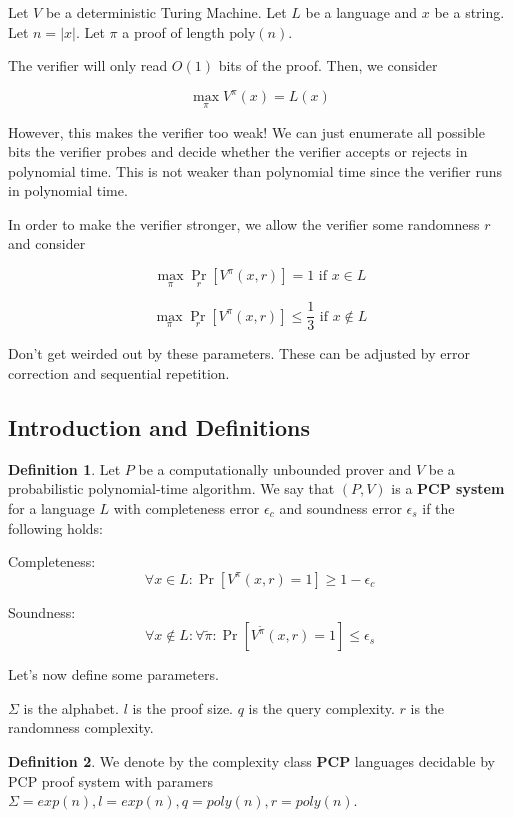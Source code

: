 \documentclass{article}
\theoremstyle{definition}
\newtheorem{definition}{Definition}
\begin{document}
Let $V$ be a deterministic Turing Machine.
Let $L$ be a language and $x$ be a string. Let $n = \lvert x \rvert$.
Let $\pi$ a proof of length $\text{poly}(n)$.

The verifier will only read $O(1)$ bits of the proof. Then, we consider

\[ \max_{\pi} V^{\pi}(x) = L(x) \]

However, this makes the verifier too weak! We can just enumerate all possible bits the verifier probes
and decide whether the verifier accepts or rejects in polynomial time. This is not weaker than polynomial time
since the verifier runs in polynomial time.

In order to make the verifier stronger, we allow the verifier some randomness $r$ and consider 

\[ \max_{\pi} \Pr_{r}[V^{\pi}(x,r)] = 1 \text{ if $x \in L$} \]

\[ \max_{\pi} \Pr_{r}[V^{\pi}(x,r)] \leq \frac{1}{3} \text{ if $x \notin L$} \]

Don't get weirded out by these parameters. These can be adjusted by error correction and sequential repetition.

\newpage

\subsection{Introduction and Definitions}

\begin{definition}
    Let $P$ be a computationally unbounded prover and $V$ be a
    probabilistic polynomial-time algorithm. We say that $(P,V)$
    is a \textbf{PCP system} for a language $L$ with completeness error
    $\epsilon_{c}$ and soundness error $\epsilon_{s}$ if the following holds:

    Completeness: \[\forall x \in L: \Pr[V^{\pi}(x,r) = 1] \geq 1 - \epsilon_{c} \]

    Soundness: \[\forall x \notin L: \forall \tilde{\pi}: \Pr[V^{\tilde{\pi}}(x,r) = 1] \leq \epsilon_{s} \]
\end{definition}

Let's now define some parameters.

$\Sigma$ is the alphabet.
$l$ is the proof size.
$q$ is the query complexity.
$r$ is the randomness complexity.

\begin{definition}
    We denote by the complexity class \textbf{PCP} languages decidable
    by PCP proof system with paramers $\Sigma = exp(n), l = exp(n), q = poly(n),
    r = poly(n)$.
\end{definition}
\end{document}

